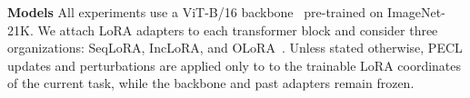 \documentclass{article}
\theoremstyle{plain}
\theoremstyle{definition}
\theoremstyle{remark}
\begin{document}
\noindent\textbf{Models}\quad
All experiments use a ViT-B/16 backbone~\cite{dosovitskiy2020image} pre-trained on ImageNet-21K.
We attach LoRA adapters to each transformer block and consider three organizations: SeqLoRA, IncLoRA, and OLoRA~\cite{wang2023orthogonal}.
Unless stated otherwise, PECL updates and perturbations are applied only to
to the trainable LoRA coordinates of the current task, while the backbone and past adapters remain frozen.

\end{document}

